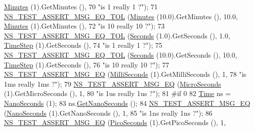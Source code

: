 \begin{DoxyCode}
      \hyperlink{group__timecivil_gaaab039c044ad40238a9d5b556349d0d5}{Minutes} (1).GetMinutes (),
70                              \textcolor{stringliteral}{"is 1 really 1 ?"});
71   \hyperlink{group__testing_ga9e7861b56b4e70db3b56044cb7a28e41}{NS\_TEST\_ASSERT\_MSG\_EQ\_TOL} (\hyperlink{group__timecivil_gaaab039c044ad40238a9d5b556349d0d5}{Minutes} (10.0).GetMinutes (), 10.0, 
      \hyperlink{group__timecivil_gaaab039c044ad40238a9d5b556349d0d5}{Minutes} (1).GetMinutes (),
72                              \textcolor{stringliteral}{"is 10 really 10 ?"});
73   \hyperlink{group__testing_ga9e7861b56b4e70db3b56044cb7a28e41}{NS\_TEST\_ASSERT\_MSG\_EQ\_TOL} (\hyperlink{group__timecivil_ga33c34b816f8ff6628e33d5c8e9713b9e}{Seconds} (1.0).GetSeconds (), 1.0, 
      \hyperlink{group__time_ga464a3c1cbb458c6c3ed3bd5ce9506758}{TimeStep} (1).GetSeconds (), 
74                              \textcolor{stringliteral}{"is 1 really 1 ?"});
75   \hyperlink{group__testing_ga9e7861b56b4e70db3b56044cb7a28e41}{NS\_TEST\_ASSERT\_MSG\_EQ\_TOL} (\hyperlink{group__timecivil_ga33c34b816f8ff6628e33d5c8e9713b9e}{Seconds} (10.0).GetSeconds (), 10.0, 
      \hyperlink{group__time_ga464a3c1cbb458c6c3ed3bd5ce9506758}{TimeStep} (1).GetSeconds (), 
76                              \textcolor{stringliteral}{"is 10 really 10 ?"});
77   \hyperlink{group__testing_ga2a9d78cffb3db8e867c35fff0b698cf5}{NS\_TEST\_ASSERT\_MSG\_EQ} (\hyperlink{group__timecivil_gaf26127cf4571146b83a92ee18679c7a9}{MilliSeconds} (1).GetMilliSeconds (), 1, 
78                          \textcolor{stringliteral}{"is 1ms really 1ms ?"});
79   \hyperlink{group__testing_ga2a9d78cffb3db8e867c35fff0b698cf5}{NS\_TEST\_ASSERT\_MSG\_EQ} (\hyperlink{group__timecivil_ga17465a639c8d1464e76538afdd78a9f0}{MicroSeconds} (1).GetMicroSeconds (), 1, 
80                          \textcolor{stringliteral}{"is 1us really 1us ?"});
81 \textcolor{preprocessor}{#if 0}
82   \hyperlink{classns3_1_1Time}{Time} ns = \hyperlink{group__timecivil_ga281d64bcb4dad96267d83c7688ec433f}{NanoSeconds} (1);
83   ns.\hyperlink{classns3_1_1Time_a2fdb7bf0e1f5cd93b6149cb37bbb7f08}{GetNanoSeconds} ();
84   \hyperlink{group__testing_ga2a9d78cffb3db8e867c35fff0b698cf5}{NS\_TEST\_ASSERT\_MSG\_EQ} (\hyperlink{group__timecivil_ga281d64bcb4dad96267d83c7688ec433f}{NanoSeconds} (1).GetNanoSeconds (), 1, 
85                          \textcolor{stringliteral}{"is 1ns really 1ns ?"});
86   \hyperlink{group__testing_ga2a9d78cffb3db8e867c35fff0b698cf5}{NS\_TEST\_ASSERT\_MSG\_EQ} (\hyperlink{group__timecivil_ga76fd2414c43c694447c6e290954c9f3a}{PicoSeconds} (1).GetPicoSeconds (), 1, 

\end{DoxyCode}
